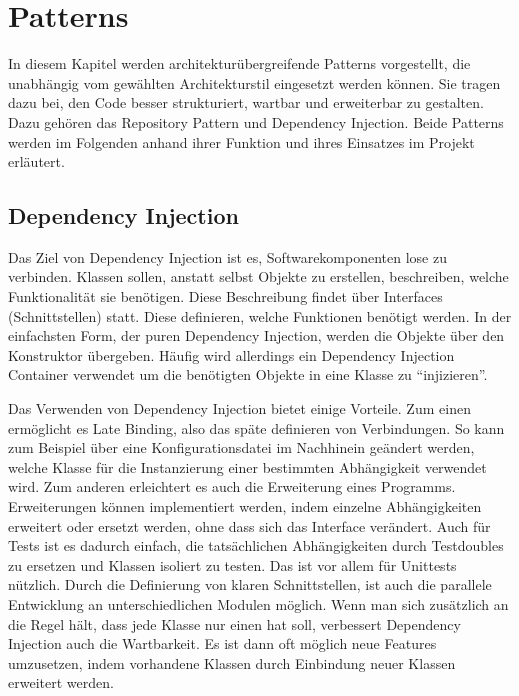 \section{Patterns}
In diesem Kapitel werden architekturübergreifende Patterns vorgestellt, die unabhängig vom gewählten Architekturstil eingesetzt werden können. Sie tragen dazu bei, den Code besser strukturiert, wartbar und erweiterbar zu gestalten. Dazu gehören das Repository Pattern und Dependency Injection. Beide Patterns werden im Folgenden anhand ihrer Funktion und ihres Einsatzes im Projekt erläutert.

\subsection{Dependency Injection}
Das Ziel von Dependency Injection ist es, Softwarekomponenten lose zu verbinden. Klassen sollen, anstatt selbst Objekte zu erstellen, beschreiben, welche Funktionalität sie benötigen. Diese Beschreibung findet über Interfaces (Schnittstellen) statt. Diese definieren, welche Funktionen benötigt werden. In der einfachsten Form, der puren Dependency Injection, werden die Objekte über den Konstruktor übergeben. Häufig wird allerdings ein Dependency Injection Container verwendet um die benötigten Objekte in eine Klasse zu \enquote{injizieren}.

Das Verwenden von Dependency Injection bietet einige Vorteile. Zum einen ermöglicht es Late Binding, also das späte definieren von Verbindungen. So kann zum Beispiel über eine Konfigurationsdatei im Nachhinein geändert werden, welche Klasse für die Instanzierung einer bestimmten Abhängigkeit verwendet wird. Zum anderen erleichtert es auch die Erweiterung eines Programms. Erweiterungen können implementiert werden, indem einzelne Abhängigkeiten erweitert oder ersetzt werden, ohne dass sich das Interface verändert. Auch für Tests ist es dadurch einfach, die tatsächlichen Abhängigkeiten durch Testdoubles zu ersetzen und Klassen isoliert zu testen. Das ist vor allem für Unittests nützlich. Durch die Definierung von klaren Schnittstellen, ist auch die parallele Entwicklung an unterschiedlichen Modulen möglich. Wenn man sich zusätzlich an die Regel hält, dass jede Klasse nur einen hat soll, verbessert Dependency Injection auch die Wartbarkeit. Es ist dann oft möglich neue Features umzusetzen, indem vorhandene Klassen durch Einbindung neuer Klassen erweitert werden.
\cite{seemann_dependency_2019}

